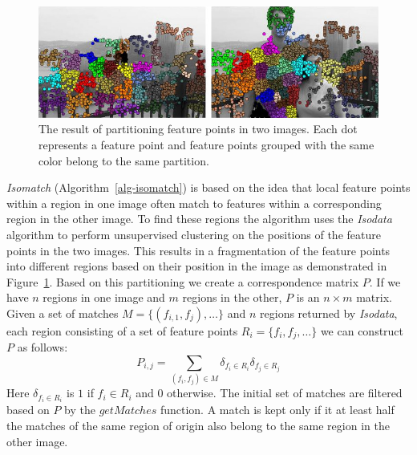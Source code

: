 \begin{figure}[htb]
	\centering
	\includegraphics[width=\columnwidth]{images/isomatch_partitions}
	\caption{The result of partitioning feature points in two images.  
	Each dot represents a feature point and feature points grouped with 
the same color belong to the same partition.}
	\label{fig:isomatch_partitions}
\end{figure}

\emph{Isomatch} (Algorithm~\ref{alg-isomatch}) \cite{das2008event} is 
based on the idea that local feature points within a region in one image 
often match to features within a corresponding region in the other 
image. To find these regions the algorithm uses the \emph{Isodata} 
algorithm \cite{ball1965isodata} to perform unsupervised clustering on 
the positions of the feature points in the two images.  This results in 
a fragmentation of the feature points into different regions based on 
their position in the image as demonstrated in 
Figure~\ref{fig:isomatch_partitions}. Based on this partitioning we 
create a correspondence matrix $P$. If we have $n$ regions in one image 
and $m$ regions in the other, $P$ is an $n \times m$ matrix.  Given a 
set of matches $M = \{(f_{i,1}, f_{j}), \ldots \}$ and $n$ regions 
returned by \emph{Isodata}, each region consisting of a set of feature 
points $R_i = \{f_i, f_j, \ldots\}$ we can construct $P$ as follows:
\begin{equation*}
    P_{i,j} = \sum_{(f_i,f_j) \in M} \delta_{f_i \in R_i}\delta_{f_j \in 
    R_j}
\end{equation*}
Here $\delta_{f_i \in R_i}$ is $1$ if $f_i \in R_i$ and $0$ otherwise.  
The initial set of matches are filtered based on $P$ by the $getMatches$ 
function. A match is kept only if it at least half the matches of the 
same region of origin also belong to the same region in the other image.  

